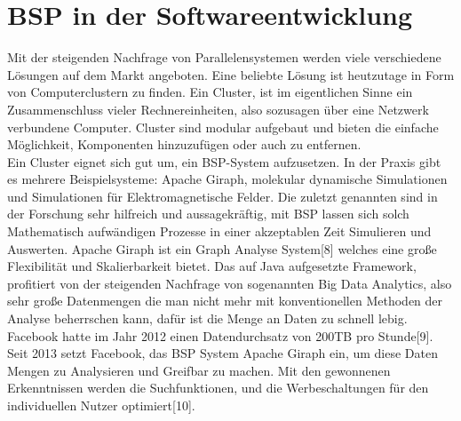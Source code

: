 \documentclass[a4paper,10pt]{scrartcl}
\begin{document}
\section{BSP in der Softwareentwicklung}
Mit der steigenden Nachfrage von Parallelensystemen werden viele verschiedene Lösungen auf dem Markt angeboten. Eine beliebte Lösung ist heutzutage in Form von Computerclustern zu finden. Ein Cluster, ist im eigentlichen Sinne ein Zusammenschluss vieler Rechnereinheiten, also sozusagen über eine Netzwerk verbundene Computer. Cluster sind modular aufgebaut und bieten die einfache Möglichkeit, Komponenten hinzuzufügen oder auch zu entfernen. \\
Ein Cluster eignet sich gut um, ein BSP-System aufzusetzen. In der Praxis gibt es mehrere Beispielsysteme: Apache Giraph, molekular dynamische Simulationen und Simulationen für Elektromagnetische Felder. Die zuletzt genannten sind in der Forschung sehr hilfreich und aussagekräftig, mit BSP lassen sich solch Mathematisch aufwändigen Prozesse in einer akzeptablen Zeit Simulieren und Auswerten. Apache Giraph ist ein Graph Analyse System[8] welches eine große Flexibilität und Skalierbarkeit bietet. Das auf Java aufgesetzte Framework, profitiert von der steigenden Nachfrage von sogenannten Big Data Analytics, also sehr große Datenmengen die man nicht mehr mit konventionellen Methoden der Analyse beherrschen kann, dafür ist die Menge an Daten zu schnell lebig. Facebook hatte im Jahr 2012 einen Datendurchsatz von 200TB pro Stunde[9]. Seit 2013 setzt Facebook, das BSP System Apache Giraph ein, um diese Daten Mengen zu Analysieren und Greifbar zu machen. Mit den gewonnenen Erkenntnissen werden die Suchfunktionen, und die Werbeschaltungen für den individuellen Nutzer optimiert[10].
\end{document}
